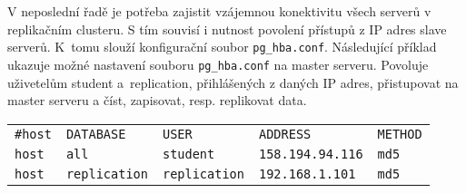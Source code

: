 V neposlední řadě je potřeba zajistit vzájemnou konektivitu všech serverů v replikačním clusteru. S tím souvisí i nutnost povolení přístupů z IP adres slave serverů. K~tomu slouží konfigurační soubor \texttt{pg\_hba.conf}. Následující příklad ukazuje možné nastavení souboru \texttt{pg\_hba.conf} na master serveru. Povoluje uživetelům student a~rep\-li\-cation, přihlášených z daných IP adres, přistupovat na master serveru a číst, zapisovat, resp. replikovat data.
      \begin{table}[H]
        \label{pgHba}
          \begin{center}
            \begin{tabular}{lllll}
              \texttt{\#host} & \texttt{DATABASE} & \texttt{USER} & \texttt{ADDRESS} & \texttt{METHOD} \\
                \texttt{host} & \texttt{all} & \texttt{student} & \texttt{158.194.94.116} & \texttt{md5} \\
       \texttt{host} & \texttt{replication} & \texttt{replication} & \texttt{192.168.1.101} &	\texttt{md5} \\
            \end{tabular}
          \end{center}
      \end{table}





